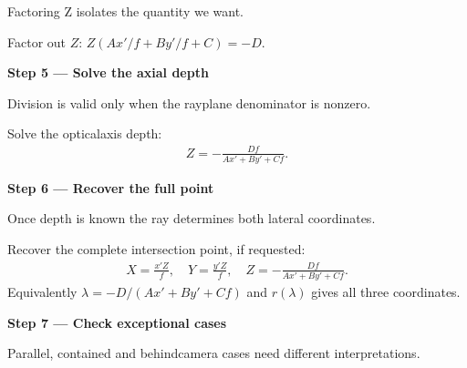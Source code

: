 \documentclass[letterpaper,11pt,english,openany,oneside]{jupyterBook}
\begin{document}
\sphinxAtStartPar
{} Factoring Z isolates the quantity we want.

\sphinxAtStartPar
Factor out {\color{QuizMathBlue} \(Z\)}: {\color{QuizMathBlue} \(Z(Ax'/f+By'/f+C)=-D\)}.

\par

\par\medskip{}
{\color{QuizStepRed}\bfseries Step 5 — Solve the axial depth}\par\smallskip

\sphinxAtStartPar
{} Division is valid only when the ray\sphinxhyphen{}plane denominator is nonzero.

\sphinxAtStartPar
Solve the optical\sphinxhyphen{}axis depth:
{\color{QuizMathBlue} \begin{equation*}
\begin{split}
\boxed{Z=-\frac{Df}{Ax'+By'+Cf}}.
\end{split}
\end{equation*}}
\par

\par\medskip{}
{\color{QuizStepRed}\bfseries Step 6 — Recover the full point}\par\smallskip

\sphinxAtStartPar
{} Once depth is known the ray determines both lateral coordinates.

\sphinxAtStartPar
Recover the complete intersection point, if requested:
{\color{QuizMathBlue} \begin{equation*}
\begin{split}
\boxed{X=\frac{x'Z}{f},\quad Y=\frac{y'Z}{f},\quad Z=-\frac{Df}{Ax'+By'+Cf}}.
\end{split}
\end{equation*}}
\sphinxAtStartPar
Equivalently {\color{QuizMathBlue} \(\lambda=-D/(Ax'+By'+Cf)\)} and {\color{QuizMathBlue} \(r(\lambda)\)} gives all three coordinates.

\par

\par\medskip{}
{\color{QuizStepRed}\bfseries Step 7 — Check exceptional cases}\par\smallskip

\sphinxAtStartPar
{} Parallel, contained and behind\sphinxhyphen{}camera cases need different interpretations.
\end{document}
